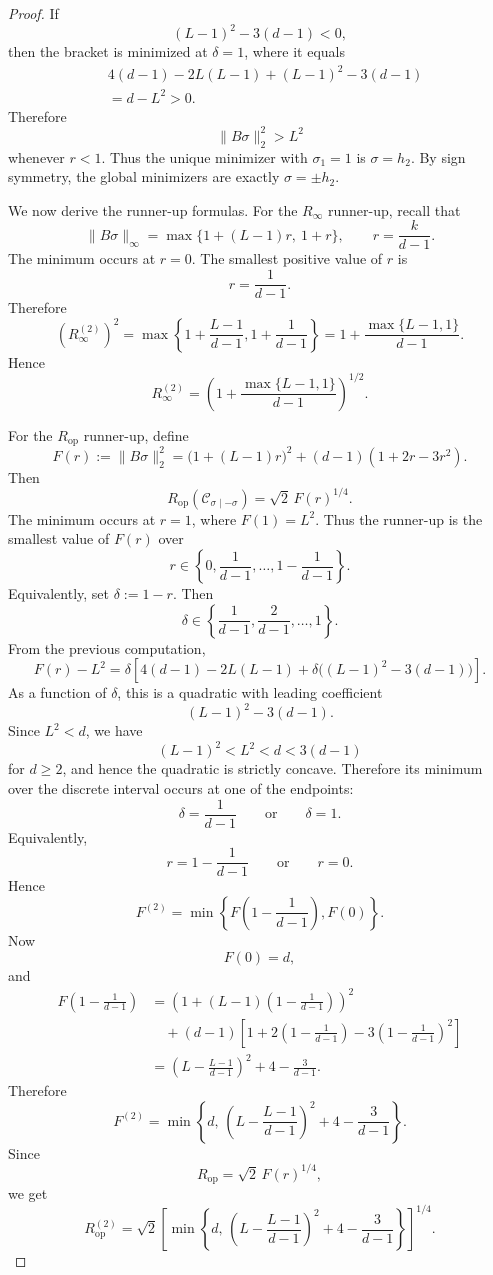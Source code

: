 \documentclass{article}
\begin{document}
\begin{proof}
If
\[
(L-1)^2-3(d-1)<0,
\]
then the bracket is minimized at $\delta=1$, where it equals
\[
\begin{aligned}
&4(d-1)-2L(L-1)+(L-1)^2-3(d-1)
\\
&=
d-L^2
>
0.
\end{aligned}
\]
Therefore
\[
\|B\sigma\|_2^2>L^2
\]
whenever $r<1$. Thus the unique minimizer with $\sigma_1=1$ is $\sigma=h_2$. By sign symmetry,
the global minimizers are exactly $\sigma=\pm h_2$.

We now derive the runner-up formulas. For the $R_\infty$ runner-up, recall that
\[
\|B\sigma\|_\infty
=
\max\{1+(L-1)r,\ 1+r\},
\qquad
r=\frac{k}{d-1}.
\]
The minimum occurs at $r=0$. The smallest positive value of $r$ is
\[
r=\frac1{d-1}.
\]
Therefore
\[
\left(R_\infty^{(2)}\right)^2
=
\max\left\{
1+\frac{L-1}{d-1},
1+\frac1{d-1}
\right\}
=
1+\frac{\max\{L-1,1\}}{d-1}.
\]
Hence
\[
R_\infty^{(2)}
=
\left(
1+\frac{\max\{L-1,1\}}{d-1}
\right)^{1/2}.
\]

For the $R_{\mathrm{op}}$ runner-up, define
\[
F(r):=\|B\sigma\|_2^2
=
\bigl(1+(L-1)r\bigr)^2
+
(d-1)(1+2r-3r^2).
\]
Then
\[
R_{\mathrm{op}}(\mathcal C_{\sigma\mid-\sigma})
=
\sqrt2\,F(r)^{1/4}.
\]
The minimum occurs at $r=1$, where $F(1)=L^2$.
Thus the runner-up is the smallest value of $F(r)$ over
\[
r\in
\left\{
0,\frac1{d-1},\dots,1-\frac1{d-1}
\right\}.
\]
Equivalently, set $\delta:=1-r$. Then
\[
\delta\in
\left\{
\frac1{d-1},\frac2{d-1},\dots,1
\right\}.
\]
From the previous computation,
\[
F(r)-L^2
=
\delta
\left[
4(d-1)-2L(L-1)
+
\delta\bigl((L-1)^2-3(d-1)\bigr)
\right].
\]
As a function of $\delta$, this is a quadratic with leading coefficient
\[
(L-1)^2-3(d-1).
\]
Since $L^2<d$, we have
\[
(L-1)^2 < L^2 < d < 3(d-1)
\]
for $d\ge2$, and hence the quadratic is strictly concave. Therefore its minimum over the discrete interval occurs at one of the endpoints:
\[
\delta=\frac1{d-1}
\qquad\text{or}\qquad
\delta=1.
\]
Equivalently,
\[
r=1-\frac1{d-1}
\qquad\text{or}\qquad
r=0.
\]
Hence
\[
F^{(2)}
=
\min\left\{
F\left(1-\frac1{d-1}\right),
F(0)
\right\}.
\]
Now
\[
F(0)=d,
\]
and
\[
\begin{aligned}
F\left(1-\frac1{d-1}\right)
&=
\left(
1+(L-1)\left(1-\frac1{d-1}\right)
\right)^2
\\
&\quad+
(d-1)
\left[
1+2\left(1-\frac1{d-1}\right)
-
3\left(1-\frac1{d-1}\right)^2
\right]
\\
&=
\left(
L-\frac{L-1}{d-1}
\right)^2
+
4-\frac{3}{d-1}.
\end{aligned}
\]
Therefore
\[
F^{(2)}
=
\min\left\{
d,\,
\left(
L-\frac{L-1}{d-1}
\right)^2
+
4-\frac{3}{d-1}
\right\}.
\]
Since
\[
R_{\mathrm{op}}=\sqrt2\,F(r)^{1/4},
\]
we get
\[
R_{\mathrm{op}}^{(2)}
=
\sqrt2
\left[
\min\left\{
d,\,
\left(
L-\frac{L-1}{d-1}
\right)^2
+
4-\frac{3}{d-1}
\right\}
\right]^{1/4}.
\]


\end{proof}
\end{document}
